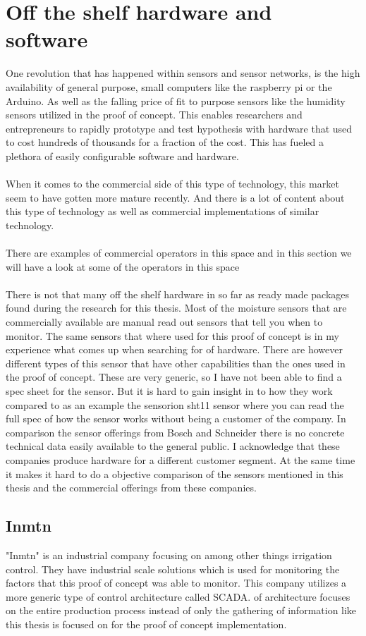 \documentclass[]{uiophd}
\begin{document}
\section{Off the shelf hardware and software}
One revolution that has happened within sensors and sensor networks, is the high availability of general purpose, small computers like the raspberry pi or the Arduino. As well as the falling price of fit to purpose sensors like the humidity sensors utilized in the proof of concept. This enables researchers and entrepreneurs to rapidly prototype and test hypothesis with hardware that used to cost hundreds of thousands for a fraction of the cost. This has fueled a plethora of easily configurable software and hardware.
\\\\
When it comes to the commercial side of this type of technology, this market seem to have gotten more mature recently. And there is a lot of content about this type of technology as well as commercial implementations of similar technology.
\\\\
There are examples of commercial operators in this space and in this section we will have a look at some of the operators in this space
\\\\
There is not that many off the shelf hardware in so far as ready made packages  found during the research for this thesis. Most of the moisture sensors that are commercially available are manual read out sensors that tell you when to monitor. The same sensors that where used for this proof of concept is in my experience what comes up when searching for  of hardware. There are however different types of this sensor that have other capabilities than the ones used in the proof of concept. These are very generic, so I have not been able to find a spec sheet for the sensor. But it is hard to gain insight in to how they work compared to as an example the sensorion sht11 sensor\cite{sensorion} where you can read the full spec of how the sensor works without being a customer of the company. In comparison the sensor offerings from Bosch and Schneider there is no concrete technical data easily available to the general public. I acknowledge that these companies produce hardware for a different customer segment. At the same time it makes it hard to do a objective comparison of the sensors mentioned in this thesis and the commercial offerings from these companies.

\subsection{Inmtn}
"Inmtn" is an industrial company focusing on among other things irrigation control. They have industrial scale solutions which is used for monitoring the factors that this proof of concept was able to monitor. This company utilizes a more generic type of control architecture called SCADA.  of architecture focuses on the entire production process instead of only the gathering of information like this thesis is focused on for the proof of concept implementation. \cite{Inmntn}
\end{document}
